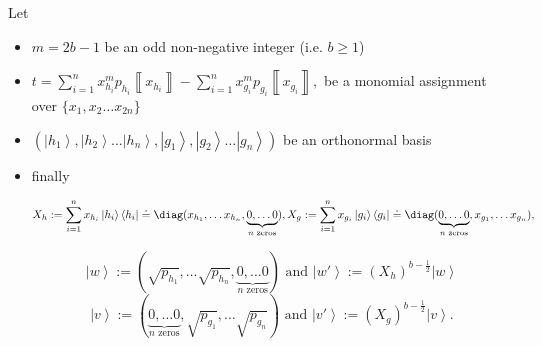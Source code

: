 \documentclass{theoretics}
\begin{document}
\begin{proposition}
  \label{prop:ExactSolnBalancedMonomialMisaligned}Let
  \begin{itemize}
    \item $m=2b-1$ be an odd non-negative integer (i.e. $b\ge1$)
    \item $
            t=\sum_{i=1}^{n}x_{h_{i}}^{m}p_{h_{i}}\left\llbracket x_{h_{i}}\right\rrbracket -\sum_{i=1}^{n}x_{g_{i}}^{m}p_{g_{i}}\left\llbracket x_{g_{i}}\right\rrbracket ,
          $ be a monomial assignment over $\{x_{1},x_{2}\dots x_{2n}\}$
    \item $\left(\left|h_{1}\right\rangle ,\left|h_{2}\right\rangle \dots\left|h_{n}\right\rangle ,\left|g_{1}\right\rangle ,\left|g_{2}\right\rangle \dots\left|g_{n}\right\rangle \right)$
          be an orthonormal basis
    \item finally
          \begin{footnotesize}
            \begin{displaymath}
              X_{h}:=\sum_{i=1}^{n}x_{h_{i}}\left|h_{i}\right\rangle \left\langle h_{i}\right|\doteq\diag(x_{h_{1}},\dots x_{h_{n}},\underbrace{0,\dots0}_{n\text{ zeros}}),
              X_{g}:=\sum_{i=1}^{n}x_{g_{i}}\left|g_{i}\right\rangle \left\langle g_{i}\right|\doteq\diag(\underbrace{0,\dots0}_{n\text{ zeros}},x_{g_{1}},\dots x_{g_{n}}),
            \end{displaymath}
          \end{footnotesize}

          \begin{displaymath}
            \left|w\right\rangle :=(\sqrt{p_{h_{1}}},\dots\sqrt{p_{h_{n}}},\underbrace{0,\dots0}_{n\text{ zeros}}) \text{ and } \left|w'\right\rangle :=(X_{h})^{b-\frac{1}{2}}\left|w\right\rangle
          \end{displaymath}
          \begin{displaymath}
            \left|v\right\rangle :=(\underbrace{0,\dots0}_{n\text{ zeros}},\sqrt{p_{g_{1}}},\dots\sqrt{p_{g_{n}}}) \text{ and }\left|v'\right\rangle :=(X_{g})^{b-\frac{1}{2}}\left|v\right\rangle.
          \end{displaymath}


\end{itemize}
\end{proposition}
\end{document}
